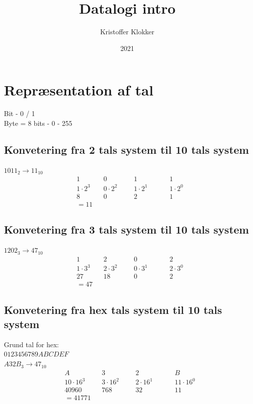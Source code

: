 \documentclass[12pt, a4paper]{article}
\title{Datalogi intro}
\date{2021}
\author{Kristoffer Klokker}
\begin{document}
	\maketitle
	\clearpage
	\tableofcontents
	\clearpage
		\section{Repræsentation af tal}
			Bit - 0 / 1\\
			Byte = 8 bits - 0 - 255\\
			\subsection{Konvetering fra 2 tals system til 10 tals system}
				$1011_2\rightarrow 11_{10}$\\
				\begin{align*}
					&1&&0&&&1&&&&1\\
					&1\cdot2^3&&0\cdot 2^2&&&1\cdot 2^1&&&&1\cdot 2^0\\
					&8&&0&&&2&&&&1\\
					&=11
				\end{align*}
			\subsection{Konvetering fra 3 tals system til 10 tals system}
				$1202_3\rightarrow 47_{10}$\\
				\begin{align*}
					&1&&2&&&0&&&&2\\
					&1\cdot3^3&&2\cdot 3^2&&&0\cdot 3^1&&&&2\cdot 3^0\\
					&27&&18&&&0&&&&2\\
					&=47
				\end{align*}
			\subsection{Konvetering fra hex tals system til 10 tals system}
				Grund tal for hex:\\
					$0 1 2 3 4 5 6 7 8 9 A B C D E F$\\
				$A32B_3\rightarrow 47_{10}$\\
				\begin{align*}
					&A&&3&&&2&&&&B\\
					&10\cdot16^3&&3\cdot 16^2&&&2\cdot 16^1&&&&11\cdot 16^0\\
					&40960&&768&&&32&&&&11\\
					&=41771
				\end{align*}
\end{document}
